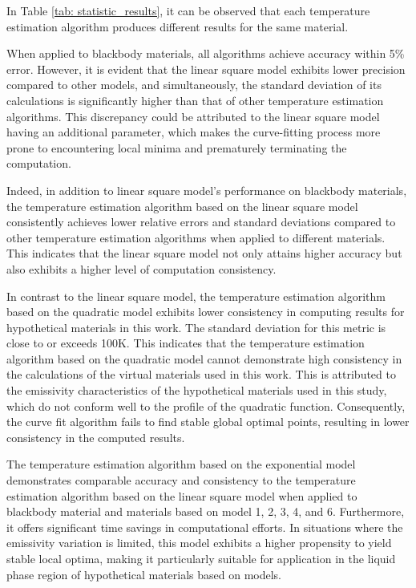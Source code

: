 In Table \ref{tab: statistic_results}, it can be observed that each temperature 
estimation algorithm produces different results for the same material. 


When applied to blackbody materials, all algorithms achieve accuracy
within 5\% error. However, it is evident that the linear square model 
exhibits lower precision compared to other models, and simultaneously, 
the standard deviation of its calculations is significantly higher than 
that of other temperature estimation algorithms. This discrepancy could be 
attributed to the linear square model having an additional parameter, which 
makes the curve-fitting process more prone to encountering local minima and 
prematurely terminating the computation.


Indeed, in addition to linear square model's performance on blackbody materials, the temperature 
estimation algorithm based on the linear square model consistently achieves 
lower relative errors and standard deviations compared to other temperature 
estimation algorithms when applied to different materials. This indicates that 
the linear square model not only attains higher accuracy but also exhibits a 
higher level of computation consistency.


In contrast to the linear square model, the temperature estimation algorithm 
based on the quadratic model exhibits lower consistency in computing results 
for hypothetical materials in this work. The standard deviation for this 
metric is close to or exceeds 100K. This indicates that the temperature 
estimation algorithm based on the quadratic model cannot demonstrate 
high consistency in the calculations of the virtual materials used in this 
work. This is attributed to the emissivity characteristics of the hypothetical materials 
used in this study, which do not conform well to the profile of the quadratic 
function. Consequently, the curve fit algorithm fails to find stable global 
optimal points, resulting in lower consistency in the computed results.


The temperature estimation algorithm based on the exponential model demonstrates 
comparable accuracy and consistency to the temperature estimation algorithm 
based on the linear square model when applied to blackbody material
and materials based on model 1, 2, 3, 4, and 6. Furthermore, it offers 
significant time savings in computational efforts. In situations where the 
emissivity variation is limited, this model exhibits a higher propensity to 
yield stable local optima, making it particularly suitable for application 
in the liquid phase region of hypothetical materials based on models.


